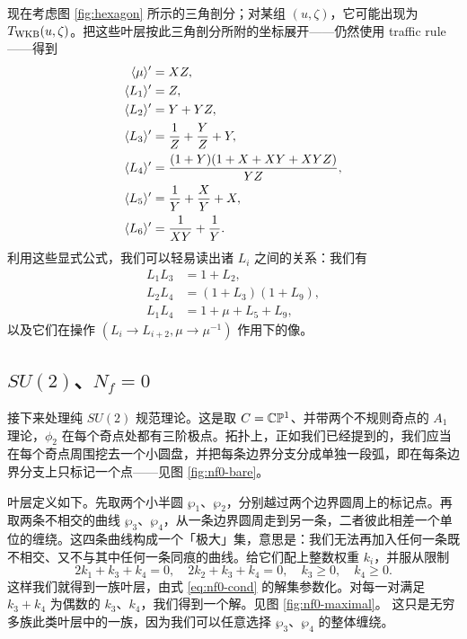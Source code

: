 现在考虑图 \ref{fig:hexagon} 所示的三角剖分；对某组 $(u, \zeta)$，它可能出现为 $T_{\rm WKB}(u, \zeta)$。把这些叶层按此三角剖分所附的坐标展开——仍然使用 traffic rule——得到
\begin{align}
\langle \mu \rangle' &= XZ, \\
\langle L_1 \rangle' &= Z, \\
\langle L_2 \rangle' &= Y + YZ, \\
\langle L_3 \rangle' &= \frac{1}{Z} + \frac{Y}{Z} + Y, \\
\langle L_4 \rangle' &= \frac{(1+Y)(1 + X + XY + XYZ)}{YZ}, \\
\langle L_5 \rangle' &= \frac{1}{Y} + \frac{X}{Y} + X, \\
\langle L_6 \rangle' &= \frac{1}{XY} + \frac{1}{Y}.
\end{align}
利用这些显式公式，我们可以轻易读出诸 $L_i$ 之间的关系：我们有
\begin{align}
L_1 L_3 &= 1 + L_2, \\
L_2 L_4 &= (1+ L_3)(1 + L_9),\\
L_1 L_4 &= 1+ \mu + L_5 + L_9,
\end{align}
以及它们在操作 $(L_i \to L_{i+2}, \mu \to \mu^{-1})$ 作用下的像。

\subsection{$SU(2)$、$N_f = 0$}\label{subsec:SU2-Lams}

接下来处理纯 $SU(2)$ 规范理论。这是取 $C = \mathbb{C}\mathbb{P}^1$、并带两个不规则奇点的 $A_1$ 理论，$\phi_2$ 在每个奇点处都有三阶极点。拓扑上，正如我们已经提到的，我们应当在每个奇点周围挖去一个小圆盘，并把每条边界分支分成单独一段弧，即在每条边界分支上只标记一个点——见图 \ref{fig:nf0-bare}。


叶层定义如下。先取两个小半圆 $\wp_1$、$\wp_2$，分别越过两个边界圆周上的标记点。再取两条不相交的曲线 $\wp_3$、$\wp_4$，从一条边界圆周走到另一条，二者彼此相差一个单位的缠绕。这四条曲线构成一个「极大」集，意思是：我们无法再加入任何一条既不相交、又不与其中任何一条同痕的曲线。给它们配上整数权重 $k_i$，并服从限制
\begin{equation} \label{eq:nf0-cond}
2 k_1 + k_3 + k_4 = 0, \quad 2 k_2 + k_3 + k_4 = 0, \quad k_3 \ge 0, \quad k_4 \ge 0.
\end{equation}
这样我们就得到一族叶层，由式 \eqref{eq:nf0-cond} 的解集参数化。对每一对满足 $k_3 + k_4$ 为偶数的 $k_3$、$k_4$，我们得到一个解。见图 \ref{fig:nf0-maximal}。
这只是无穷多族此类叶层中的一族，因为我们可以任意选择 $\wp_3$、$\wp_4$ 的整体缠绕。

